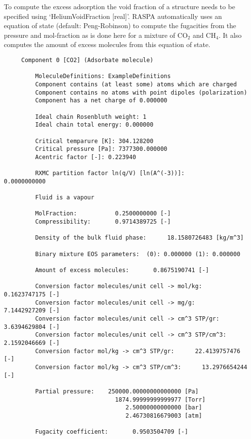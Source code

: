 To compute the excess adsorption the void fraction of a structure needs to be specified using `HeliumVoidFraction [real]'. RASPA automatically uses an
equation of state (default: Peng-Robinson) to compute the fugacities from the pressure and mol-fraction as is done here for a mixture of CO$_2$ and CH$_4$.
It also computes the amount of excess molecules from this equation of state.
\begin{tiny}
\begin{verbatim}
     Component 0 [CO2] (Adsorbate molecule)

         MoleculeDefinitions: ExampleDefinitions
         Component contains (at least some) atoms which are charged
         Component contains no atoms with point dipoles (polarization)
         Component has a net charge of 0.000000

         Ideal chain Rosenbluth weight: 1
         Ideal chain total energy: 0.000000

         Critical temparure [K]: 304.128200
         Critical pressure [Pa]: 7377300.000000
         Acentric factor [-]: 0.223940

         RXMC partition factor ln(q/V) [ln(A^(-3))]:       0.0000000000

         Fluid is a vapour

         MolFraction:           0.2500000000 [-]
         Compressibility:       0.9714389725 [-]

         Density of the bulk fluid phase:      18.1580726483 [kg/m^3]

         Binary mixture EOS parameters:  (0): 0.000000 (1): 0.000000

         Amount of excess molecules:       0.8675190741 [-]

         Conversion factor molecules/unit cell -> mol/kg:       0.1623747175 [-]
         Conversion factor molecules/unit cell -> mg/g:       7.1442927209 [-]
         Conversion factor molecules/unit cell -> cm^3 STP/gr:       3.6394629804 [-]
         Conversion factor molecules/unit cell -> cm^3 STP/cm^3:       2.1592046669 [-]
         Conversion factor mol/kg -> cm^3 STP/gr:      22.4139757476 [-]
         Conversion factor mol/kg -> cm^3 STP/cm^3:      13.2976654244 [-]

         Partial pressure:    250000.00000000000000 [Pa]
                                1874.99999999999977 [Torr]
                                   2.50000000000000 [bar]
                                   2.46730816679003 [atm]

         Fugacity coefficient:       0.9503504709 [-]


\end{verbatim}
\end{tiny}
